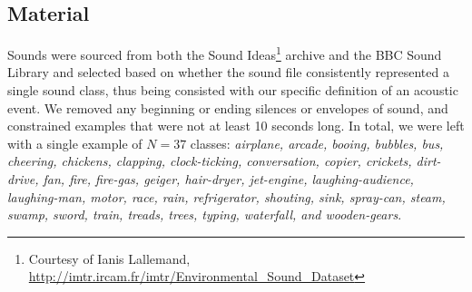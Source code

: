 \documentclass[a4paper,10pt,final]{ThesisStyle}
\begin{document}
\subsection{Material}
Sounds were sourced from both the Sound Ideas\footnote{Courtesy of Ianis Lallemand, \url{http://imtr.ircam.fr/imtr/Environmental\_Sound\_Dataset}} archive and the BBC Sound Library and selected based on whether the sound file consistently represented a single sound class, thus being consisted with our specific definition of an acoustic event.  We removed any beginning or ending silences or envelopes of sound, and constrained examples that were not at least 10 seconds long.  In total, we were left with a single example of $N = 37$ classes: \textit{airplane, arcade, booing, bubbles, bus, cheering, chickens, clapping, clock-ticking, conversation, copier, crickets, dirt-drive, fan, fire, fire-gas, geiger, hair-dryer, jet-engine, laughing-audience, laughing-man, motor, race, rain, refrigerator, shouting, sink, spray-can, steam, swamp, sword, train, treads, trees, typing, waterfall, and wooden-gears}.  
\end{document}
